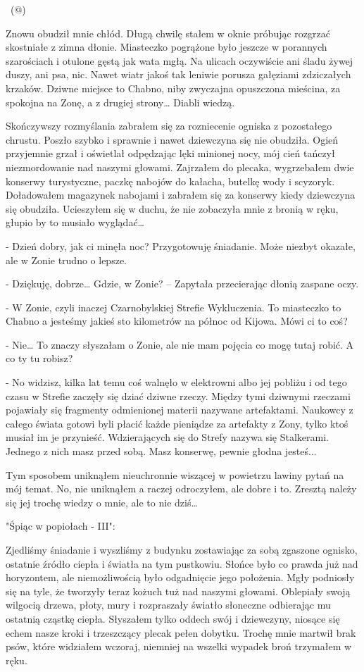 \documentclass[../MAIN.tex]{subfiles}
\begin{document}
~(@)~

Znowu obudził mnie chłód. Długą chwilę stałem w oknie próbując rozgrzać skostniałe z zimna dłonie. Miasteczko pogrążone było jeszcze w porannych szarościach i otulone gęstą jak wata mgłą. Na ulicach oczywiście ani śladu żywej duszy, ani psa, nic. Nawet wiatr jakoś tak leniwie porusza gałęziami zdziczałych krzaków. Dziwne miejsce to Chabno, niby zwyczajna opuszczona mieścina, za spokojna na Zonę, a z drugiej strony… Diabli wiedzą.

Skończywszy rozmyślania zabrałem się za rozniecenie ogniska z pozostałego chrustu. Poszło szybko i sprawnie i nawet dziewczyna się nie obudziła. Ogień przyjemnie grzał i oświetlał odpędzając lęki minionej nocy, mój cień tańczył niezmordowanie nad naszymi głowami. Zajrzałem do plecaka, wygrzebałem dwie konserwy turystyczne, paczkę nabojów do kałacha, butelkę wody i scyzoryk. Doładowałem magazynek nabojami i zabrałem się za konserwy kiedy dziewczyna się obudziła. Ucieszyłem się w duchu, że nie zobaczyła mnie z bronią w ręku, głupio by to musiało wyglądać…

- Dzień dobry, jak ci minęła noc? Przygotowuję śniadanie. Może niezbyt okazałe, ale w Zonie trudno o lepsze.

- Dziękuję, dobrze… Gdzie, w Zonie? – Zapytała przecierając dłonią zaspane oczy.

- W Zonie, czyli inaczej Czarnobylskiej Strefie Wykluczenia. To miasteczko to Chabno a jesteśmy jakieś sto kilometrów na północ od Kijowa. Mówi ci to coś?

- Nie… To znaczy słyszałam o Zonie, ale nie mam pojęcia co mogę tutaj robić. A co ty tu robisz?

- No widzisz, kilka lat temu coś walnęło w elektrowni albo jej pobliżu i od tego czasu w Strefie zaczęły się dziać dziwne rzeczy. Między tymi dziwnymi rzeczami pojawiały się fragmenty odmienionej materii nazywane artefaktami. Naukowcy z całego świata gotowi byli płacić każde pieniądze za artefakty z Zony, tylko ktoś musiał im je przynieść. Wdzierających się do Strefy nazywa się Stalkerami. Jednego z nich masz przed sobą. Masz konserwę, pewnie głodna jesteś...

Tym sposobem uniknąłem nieuchronnie wiszącej w powietrzu lawiny pytań na mój temat. No, nie uniknąłem a raczej odroczyłem, ale dobre i to. Zresztą należy się jej trochę wiedzy o mnie, ale to nie dziś…

"Śpiąc w popiołach - III":  

Zjedliśmy śniadanie i wyszliśmy z budynku zostawiając za sobą zgaszone ognisko, ostatnie źródło ciepła i światła na tym pustkowiu. Słońce było co prawda już nad horyzontem, ale niemożliwością było odgadnięcie jego położenia. Mgły podniosły się na tyle, że tworzyły teraz kożuch tuż nad naszymi głowami. Oblepiały swoją wilgocią drzewa, płoty, mury i rozpraszały światło słoneczne odbierając mu ostatnią cząstkę ciepła. Słyszałem tylko oddech swój i dziewczyny, niosące się echem nasze kroki i trzeszczący plecak pełen dobytku. Trochę mnie martwił brak psów, które widziałem wczoraj, niemniej na wszelki wypadek broń trzymałem w ręku.
\end{document}
